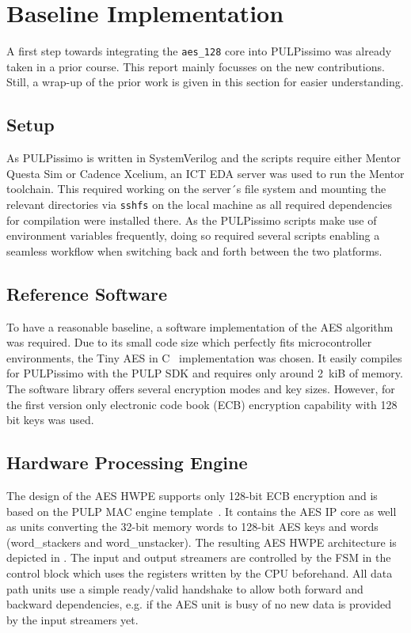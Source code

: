 \documentclass[a4paper, 12pt]{article}
\begin{document}
\section{Baseline Implementation} \label{sec:implementation}

A first step towards integrating the \verb|aes_128| core into PULPissimo was already taken in a prior course. This report mainly focusses on the new contributions. Still, a wrap-up of the prior work is given in this section for easier understanding.

\subsection{Setup} \label{sec:implementation:setup}

As PULPissimo is written in SystemVerilog and the scripts require either Mentor Questa Sim or Cadence Xcelium, an ICT EDA server was used to run the Mentor toolchain. This required working on the server´s file system and mounting the relevant directories via \texttt{sshfs} on the local machine as all required dependencies for compilation were installed there. As the PULPissimo scripts make use of environment variables frequently, doing so required several scripts enabling a seamless workflow when switching back and forth between the two platforms.

\subsection{Reference Software}

To have a reasonable baseline, a software implementation of the AES algorithm was required. Due to its small code size which perfectly fits microcontroller environments, the Tiny AES in C~\cite{tiny-aes-c} implementation was chosen. It easily compiles for PULPissimo with the PULP SDK and requires only around \SI{2}{kiB} of memory. The software library offers several encryption modes and key sizes. However, for the first version only electronic code book (ECB) encryption capability with 128 bit keys was used. 

\subsection{Hardware Processing Engine}

The design of the AES HWPE supports only 128-bit ECB encryption and is based on the PULP MAC engine template~\cite{hwpe-mac}. It contains the AES IP core as well as units converting the 32-bit memory words to 128-bit AES keys and words (word\_stackers and word\_unstacker). The resulting AES HWPE architecture is depicted in . The input and output streamers are controlled by the FSM in the control block which uses the registers written by the CPU beforehand. All data path units use a simple ready/valid handshake to allow both forward and backward dependencies, e.g. if the AES unit is busy of no new data is provided by the input streamers yet.
\end{document}
